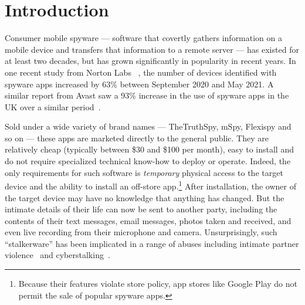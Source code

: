 \section{Introduction}

Consumer mobile spyware --- software that covertly gathers information
on a mobile device and transfers that information to a remote server
--- has existed for at least two decades, but has grown significantly
in popularity in recent years.  In one recent study from Norton Labs
~\cite{AYearAft87:online}, the number of devices identified with
spyware apps increased by 63\% between September 2020 and May 2021. A
similar report from Avast saw a 93\% increase in the use of spyware
apps in the UK over a similar period~\cite{UseofSta91:online}.

Sold under a wide variety of brand names --- TheTruthSpy, mSpy,
Flexispy and so on --- these apps are marketed directly to the general
public.  They are relatively cheap (typically between \$30 and \$100
per month), easy to install and do not require specialized technical
know-how to deploy or operate.  Indeed, the only requirements for such
software is \emph{temporary} physical access to the target device
and the ability to install an off-store app.\footnote{Because their features
  violate store policy, app stores like Google Play do not permit the sale of popular spyware apps.}  After
installation, the owner of the target device may have no knowledge
that anything has changed.  But the intimate details of their life can
now be sent to another party, including the contents of their text
messages, email messages, photos taken and received, and even live
recording from their microphone and camera.  Unsurprisingly, such
``stalkerware'' has been implicated in a range of abuses including
intimate partner violence~\cite{chatterjee2018spyware} and
cyberstalking~\cite{woodlock2017abuse}.

